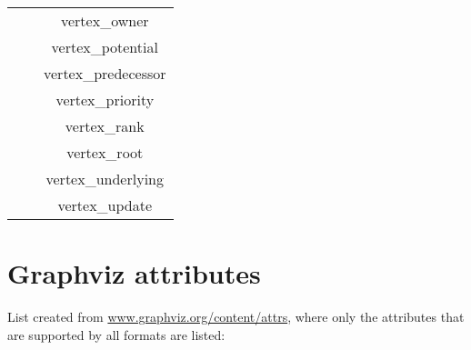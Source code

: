 \begin{table}[h!]
\begin{tabular}{c c c}
                             &                & vertex\_owner              \\
                             &                & vertex\_potential          \\
                             &                & vertex\_predecessor        \\
                             &                & vertex\_priority           \\
                             &                & vertex\_rank               \\
                             &                & vertex\_root               \\
                             &                & vertex\_underlying         \\
                             &                & vertex\_update             \\
    \hline
  \end{tabular}
\end{table}

\section{Graphviz attributes}
\label{subsec:Graphviz-attributes}

List created from \url{www.graphviz.org/content/attrs}, 
where only the attributes that are supported by all formats are listed:

